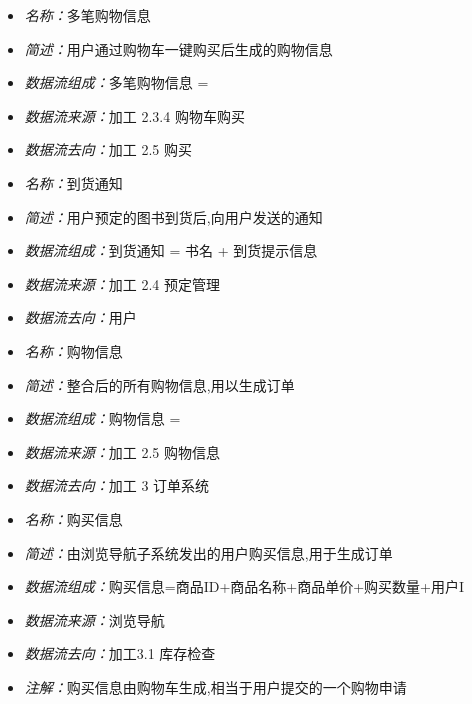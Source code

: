 \vspace{-1mm}

\begin{itemize}
	\item \textit{名称：}多笔购物信息
	\item \textit{简述：}用户通过购物车一键购买后生成的购物信息
	\item \textit{数据流组成：}多笔购物信息 = 
	\item \textit{数据流来源：}加工 2.3.4 购物车购买
	\item \textit{数据流去向：}加工 2.5 购买
\end{itemize}

\vspace{-1mm}

\begin{itemize}
	\item \textit{名称：}到货通知
	\item \textit{简述：}用户预定的图书到货后,向用户发送的通知
	\item \textit{数据流组成：}到货通知 = 书名 + 到货提示信息
	\item \textit{数据流来源：}加工 2.4 预定管理
	\item \textit{数据流去向：}用户
\end{itemize}

\vspace{-1mm}

\begin{itemize}
	\item \textit{名称：}购物信息
	\item \textit{简述：}整合后的所有购物信息,用以生成订单
	\item \textit{数据流组成：}购物信息 =
	\item \textit{数据流来源：}加工 2.5 购物信息
	\item \textit{数据流去向：}加工 3 订单系统
\end{itemize}

\vspace{-1mm}

\begin{itemize}
	\item \textit{名称：}购买信息
	\item \textit{简述：}由浏览导航子系统发出的用户购买信息,用于生成订单
	\item \textit{数据流组成：}购买信息=商品ID+商品名称+商品单价+购买数量+用户I
	\item \textit{数据流来源：}浏览导航
	\item \textit{数据流去向：}加工3.1 库存检查
	\item \textit{注解：}购买信息由购物车生成,相当于用户提交的一个购物申请
\end{itemize}

